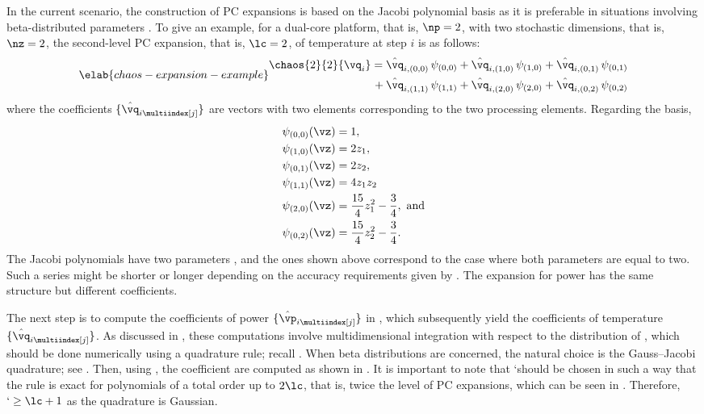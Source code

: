 In the current scenario, the construction of \ac{PC} expansions is based on the
Jacobi polynomial basis as it is preferable in situations involving
beta-distributed parameters \cite{xiu2010}. To give an example, for a dual-core
platform, that is, $\np = 2$, with two stochastic dimensions, that is, $\nz =
2$, the second-level \ac{PC} expansion, that is, $\lc = 2$, of temperature at
step $i$ is as follows:
\begin{equation} \elab{chaos-expansion-example}
  \begin{split}
    \chaos{2}{2}{\vq_i}
    =    {} & \hat{\vq}_{i, (0, 0)} \, \psi_{(0, 0)} +
              \hat{\vq}_{i, (1, 0)} \, \psi_{(1, 0)} +
              \hat{\vq}_{i, (0, 1)} \, \psi_{(0, 1)} \\
    {} + {} & \hat{\vq}_{i, (1, 1)} \, \psi_{(1, 1)} +
              \hat{\vq}_{i, (2, 0)} \, \psi_{(2, 0)} +
              \hat{\vq}_{i, (0, 2)} \, \psi_{(0, 2)}
  \end{split}
\end{equation}
where the coefficients $\{ \hat{\vq}_{i \multiindex[j]} \}$ are vectors with two
elements corresponding to the two processing elements. Regarding the basis,
\begin{align*}
  & \psi_{(0, 0)}(\vz) = 1, \\
  & \psi_{(1, 0)}(\vz) = 2 z_1, \\
  & \psi_{(0, 1)}(\vz) = 2 z_2, \\
  & \psi_{(1, 1)}(\vz) = 4 z_1 z_2 \\
  & \psi_{(2, 0)}(\vz) = \frac{15}{4} z_1^2 - \frac{3}{4}, \text{ and} \\
  & \psi_{(0, 2)}(\vz) = \frac{15}{4} z_2^2 - \frac{3}{4}.
\end{align*}
The Jacobi polynomials have two parameters \cite{xiu2010}, and the ones shown
above correspond to the case where both parameters are equal to two. Such a
series might be shorter or longer depending on the accuracy requirements given
by \lc. The expansion for power has the same structure but different
coefficients.

The next step is to compute the coefficients of power $\{ \hat{\vp}_{i
\multiindex[j]} \}$ in , which subsequently yield the
coefficients of temperature $\{ \hat{\vq}_{i \multiindex[j]} \}$. As discussed
in , these computations involve multidimensional
integration with respect to the distribution of \vz, which should be done
numerically using a quadrature rule; recall .
When beta distributions are concerned, the natural choice is the Gauss--Jacobi
quadrature; see . Then, using
, the coefficient are computed as shown in
. It is important to note that \lq should be chosen in
such a way that the rule is exact for polynomials of a total order up to $2
\lc$, that is, twice the level of \ac{PC} expansions, which can be seen in
 \cite{eldred2008}. Therefore, $\lq \geq \lc + 1$ as the
quadrature is Gaussian.

